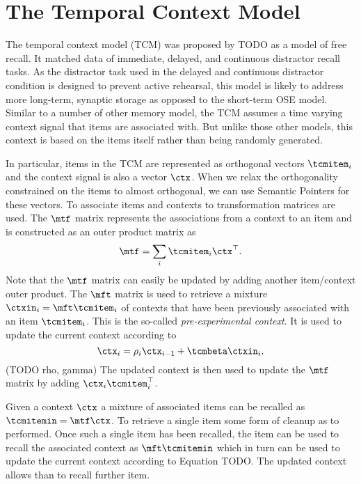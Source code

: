 \chapter{The Temporal Context Model}\label{sec:tcm}
The temporal context model (TCM) was proposed by TODO as a model of free recall.
It matched data of immediate, delayed, and continuous distractor recall tasks.
As the distractor task used in the delayed and continuous distractor condition is designed to prevent active rehearsal, this model is likely to address more long-term, synaptic storage as opposed to the short-term OSE model.
Similar to a number of other memory model, the TCM assumes a time varying context signal that items are associated with.
But unlike those other models, this context is based on the items itself rather than being randomly generated.

In particular, items in the TCM are represented as orthogonal vectors $\tcmitem_i$ and the context signal is also a vector $\ctx$.
When we relax the orthogonality constrained on the items to almost orthogonal, we can use Semantic Pointers for these vectors.
To associate items and contexts to transformation matrices are used.
The $\mtf$ matrix represents the associations from a context to an item and is constructed as an outer product matrix as
\begin{equation}
    \mtf = \sum_i \tcmitem_i \ctx\Tr \text{.}
\end{equation}
Note that the $\mtf$ matrix can easily be updated by adding another item/context outer product.
The $\mft$ matrix is used to retrieve a mixture $\ctxin_i = \mft \tcmitem_i$ of contexts that have been previously associated with an item $\tcmitem_i$.
This is the so-called \emph{pre-experimental context}.
It is used to update the current context according to
\begin{equation}
    \ctx_i = \rho_i \ctx_{i-1} + \tcmbeta \ctxin_i \text{.}
\end{equation}
(TODO rho, gamma)
The updated context is then used to update the $\mtf$ matrix by adding $\ctx_i \tcmitem_i\Tr$.

Given a context $\ctx$ a mixture of associated items can be recalled as $\tcmitemin = \mtf \ctx$.
To retrieve a single item some form of cleanup as to performed.
Once such a single item has been recalled, the item can be used to recall the associated context as $\mft \tcmitemin$ which in turn can be used to update the current context according to Equation TODO\@.
The updated context allows than to recall further item.

